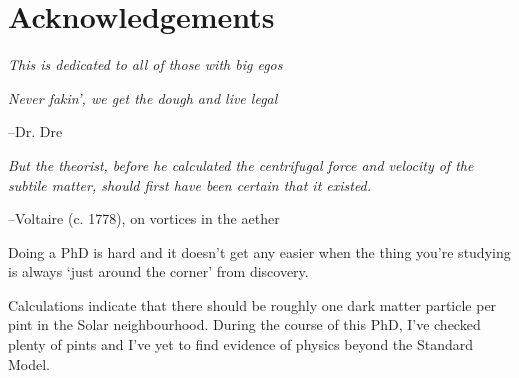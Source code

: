 \chapter*{Acknowledgements}

\begin{center}
\textit{This is dedicated to all of those with big egos}

\textit{Never fakin', we get the dough and live legal}
\end{center}
\begin{flushright}
  --Dr. Dre
\end{flushright}

\begin{center}
\textit{But the theorist, before he calculated the centrifugal force and velocity of the subtile matter, should first have been certain that it existed.}
\end{center}
\begin{flushright}
  --Voltaire (c. 1778), on vortices in the aether
\end{flushright}

Doing a PhD is hard and it doesn't get any easier when the thing you're studying is always `just around the corner' from discovery.

Calculations indicate that there should be roughly one dark matter particle per pint in the Solar neighbourhood. During the course of this PhD, I've checked plenty of pints and I've yet to find evidence of physics beyond the Standard Model.
